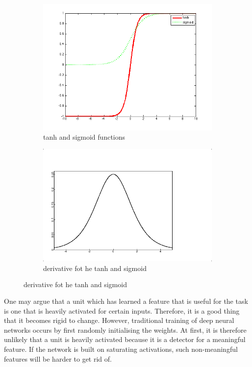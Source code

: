 \documentclass[a4paper,11pt]{article}
\begin{document}
\begin{figure}[h!]
	\centering
	\begin{subfigure}{.5\textwidth}
  		\centering
		\includegraphics[scale=0.4]{images/tanh_sigmoid.png}
		\caption{tanh and sigmoid functions}
	\end{subfigure}%
	\begin{subfigure}{.5\textwidth}
  		\centering
		\includegraphics[scale=0.4]{images/logistic_derivative.png}
		\caption{derivative fot he tanh and sigmoid}
	\end{subfigure}
\end{figure}

One may argue that a unit which has learned a feature that is useful for the task is one that is heavily activated for certain inputs. Therefore, it is a good thing that it becomes rigid to change. However, traditional training of deep neural networks occurs by first randomly initialising the weights. At first, it is therefore unlikely that a unit is heavily activated because it is a detector for a meaningful feature. If the network is built on saturating activations, such non-meaningful features will be harder to get rid of. \\
\end{document}
